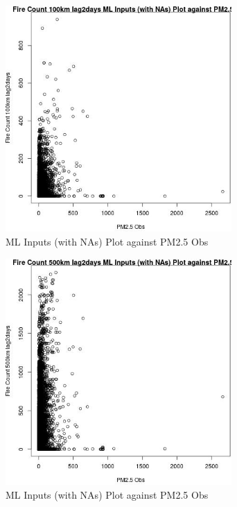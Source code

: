 \begin{figure} 
\centering  
\includegraphics[width=0.77\textwidth]{Code_Outputs/Report_ML_input_PM25_Step4_part_e_de_duplicated_aves_compiled_2019-05-21wNAs_Fire_Count_100km_lag2daysvPM25_Obs.jpg} 
\caption{\label{fig:Report_ML_input_PM25_Step4_part_e_de_duplicated_aves_compiled_2019-05-21wNAsFire_Count_100km_lag2daysvPM25_Obs}ML Inputs (with NAs) Plot against PM2.5 Obs} 
\end{figure} 
 

\begin{figure} 
\centering  
\includegraphics[width=0.77\textwidth]{Code_Outputs/Report_ML_input_PM25_Step4_part_e_de_duplicated_aves_compiled_2019-05-21wNAs_Fire_Count_500km_lag2daysvPM25_Obs.jpg} 
\caption{\label{fig:Report_ML_input_PM25_Step4_part_e_de_duplicated_aves_compiled_2019-05-21wNAsFire_Count_500km_lag2daysvPM25_Obs}ML Inputs (with NAs) Plot against PM2.5 Obs} 
\end{figure} 
 

